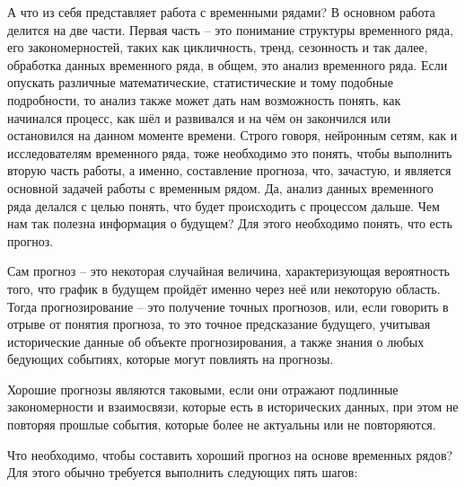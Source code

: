 {  \par А что из себя представляет работа с временными рядами? В основном работа делится на две части. Первая часть – это понимание структуры временного ряда, его закономерностей, таких как цикличность, тренд, сезонность и так далее, обработка данных временного ряда, в общем, это анализ временного ряда. Если опускать различные математические, статистические и тому подобные подробности, то анализ также может дать нам возможность понять, как начинался процесс, как шёл и развивался и на чём он закончился или остановился на данном моменте времени.  Строго говоря, нейронным сетям, как и исследователям временного ряда, тоже необходимо это понять, чтобы выполнить вторую часть работы, а именно, составление прогноза, что, зачастую, и является основной задачей работы с временным рядом. Да, анализ данных временного ряда делался с целью понять, что будет происходить с процессом дальше. Чем нам так полезна информация о будущем? Для этого необходимо понять, что есть прогноз. 

  \par Сам прогноз – это некоторая случайная величина, характеризующая вероятность того, что график в будущем пройдёт именно через неё или некоторую область. Тогда прогнозирование – это получение точных прогнозов, или, если говорить в отрыве от понятия прогноза, то это точное предсказание будущего, учитывая исторические данные об объекте прогнозирования, а также знания о любых бедующих событиях, которые могут повлиять на прогнозы. 

  \par Хорошие прогнозы являются таковыми, если они отражают подлинные закономерности и взаимосвязи, которые есть в исторических данных, при этом не повторяя прошлые события, которые более не актуальны или не повторяются. 

  \par Что необходимо, чтобы составить хороший прогноз на основе временных рядов? Для этого обычно требуется выполнить следующих пять шагов:

}

